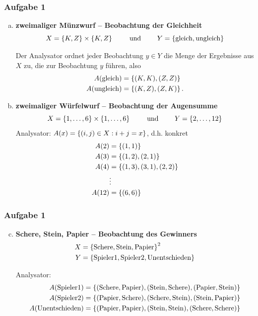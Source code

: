\documentclass{beamer}
\DeclareMathOperator{\schere}{Schere}
\DeclareMathOperator{\stein}{Stein}
\DeclareMathOperator{\papier}{Papier}
\begin{document}
\begin{frame} \frametitle{Aufgabe 1}
	\footnotesize
	\begin{enumerate}[(a)]
		\item \textbf{zweimaliger Münzwurf -- Beobachtung der Gleichheit}
		\begin{equation*}
			X = \left\{ K,Z \right\} \times \left\{ K,Z \right\} \qquad \text{ und } \qquad
			Y = \left\{ \operatorname{gleich}, \operatorname{ungleich} \right\} 
		\end{equation*}
	
		Der Analysator ordnet jeder Beobachtung $y \in Y$ die Menge der Ergebnisse aus $X$ zu, die zur Beobachtung $y$ führen, also
		\begin{align*}
			A(\operatorname{gleich}) &= \left\{ (K,K), (Z,Z) \right\} \\
			A(\operatorname{ungleich}) &= \left\{ (K,Z), (Z,K) \right\}.			
		\end{align*}
		\item \textbf{zweimaliger Würfelwurf -- Beobachtung der Augensumme}
		\begin{equation*}
			X = \left\{ 1, \dots, 6 \right\} \times \left\{ 1, \dots, 6 \right\}
			\qquad \text{ und } \qquad
			Y = \left\{ 2, \dots, 12 \right\} 
		\end{equation*}
		Analysator: $A(x) = \left\{ (i,j) \in X : i + j = x \right\}$, d.h. konkret
		\begin{align*}
			A(2) &= \left\{ (1,1) \right\} \\
			A(3) &= \left\{ (1,2), (2,1) \right\} \\
			A(4) &= \left\{ (1,3), (3,1), (2,2) \right\} \\
			&\vdots \\
			A(12) &= \left\{ (6,6) \right\}			
		\end{align*}
	\end{enumerate}
\end{frame}

\begin{frame} \frametitle{Aufgabe 1}
	\footnotesize
	\begin{enumerate}[(a)]
		\setcounter{enumi}{2}
		\item \textbf{Schere, Stein, Papier -- Beobachtung des Gewinners}
		\begin{align*}
			X &= \left\{ \operatorname{Schere}, \operatorname{Stein}, \operatorname{Papier} \right\}^2 \\
			Y &= \left\{ \operatorname{Spieler1}, \operatorname{Spieler2}, \operatorname{Unentschieden} \right\} 
		\end{align*}
		
		Analysator:
		\begin{align*}
			A(\operatorname{Spieler1}) &= \menge{(\schere, \papier), (\stein, \schere), (\papier, \stein)} \\
			A(\operatorname{Spieler2}) &= \menge{(\papier, \schere), (\schere, \stein), (\stein, \papier)} \\
			A(\operatorname{Unentschieden}) &= \menge{(\papier, \papier), (\stein, \stein), (\schere, \schere)}		
		\end{align*}
	\end{enumerate}
\end{frame}
\end{document}

